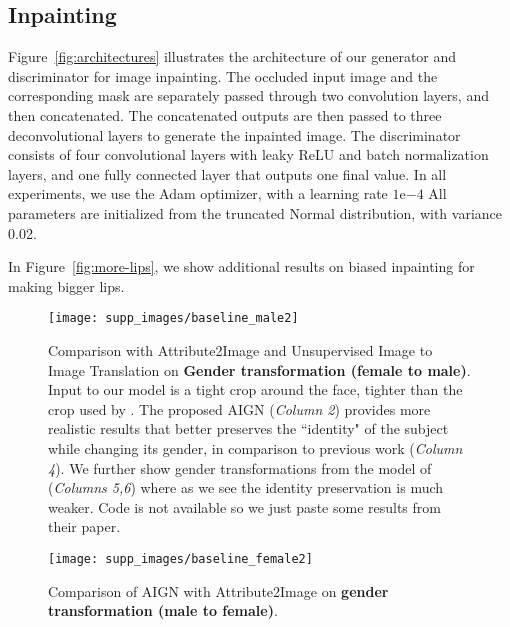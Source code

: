 \documentclass[10pt,twocolumn,letterpaper]{article}
\begin{document}
\subsection{Inpainting}

Figure~\ref{fig:architectures} illustrates the architecture of our generator and discriminator for image inpainting.
The occluded input image and the corresponding mask are separately passed through two convolution 
layers, and then concatenated. The concatenated outputs are then passed to three deconvolutional layers  
to generate the inpainted image.  
The discriminator  consists of four convolutional layers  with leaky ReLU and batch normalization layers, and one fully connected layer that outputs one final value.  
In all experiments, we use the Adam optimizer, with a learning rate $1\mathrm{e}{-4}$%
All parameters are initialized from the truncated Normal distribution, with variance 0.02. 




In Figure~\ref{fig:more-lips}, 
we show additional results on biased inpainting for making bigger lips.



\begin{figure}[t]
    \centering
    \texttt{[image: supp\_images/baseline\_male2]}
     \centering
    \caption{Comparison with Attribute2Image \cite{DBLP:journals/corr/YanYSL15} and Unsupervised Image to Image Translation \cite{DBLP:journals/corr/DongNWG17} on \textbf{Gender transformation (female to male)}. Input to our model is a tight crop around the face, tighter than the crop used by \cite{DBLP:journals/corr/YanYSL15}. The proposed AIGN (\textit{Column 2}) provides more realistic results that better preserves the ``identity" of the subject while changing its gender, in comparison to previous work \cite{DBLP:journals/corr/YanYSL15} (\textit{Column 4}). We further show gender transformations from the model of \cite{DBLP:journals/corr/DongNWG17} (\textit{Columns 5,6}) where as we see the identity preservation is much weaker. Code is not available so we just paste some results from their paper. }
    \label{fig:baseline-male}
\end{figure}

\begin{figure}[t]
    \centering
    \texttt{[image: supp\_images/baseline\_female2]}
     \centering
    \caption{Comparison of AIGN with Attribute2Image \cite{DBLP:journals/corr/YanYSL15}  on \textbf{gender transformation (male to female)}.}
    \label{fig:baseline-female}
\end{figure}
\end{document}
